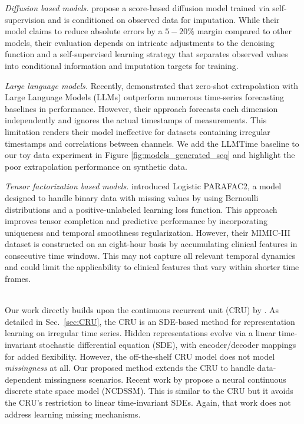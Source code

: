 \emph{Diffusion based models.}
\citet{tashiro2021csdi} propose a score-based diffusion model trained via self-supervision and is conditioned on observed data for imputation. While their model claims to reduce absolute errors by a $5-20\%$ margin compared to other models, their evaluation depends on intricate adjustments to the denoising function and a self-supervised learning strategy that separates observed values into conditional information and imputation targets for training.

\emph{Large language models.} Recently, \citet{gruver2023large} demonstrated that zero-shot extrapolation with Large Language Models (LLMs) outperform numerous time-series forecasting baselines in performance. However, their approach forecasts each dimension independently and ignores the actual timestamps of measurements. This limitation renders their model ineffective for datasets containing irregular timestamps and correlations between channels. We add the LLMTime baseline to our toy data experiment in Figure \ref{fig:models_generated_seq} and highlight the poor extrapolation performance on synthetic data.

\emph{Tensor factorization based models.} \citep{yin2020logpar} introduced Logistic PARAFAC2, a model designed to handle binary data with missing values by using Bernoulli distributions and a positive-unlabeled learning loss function. This approach improves tensor completion and predictive performance by incorporating uniqueness and temporal smoothness regularization. However, their MIMIC-III dataset is constructed on an eight-hour basis by accumulating clinical features in consecutive time windows. This may not capture all relevant temporal dynamics and could limit the applicability to clinical features that vary within shorter time frames.

~\\ \noindent
Our work directly builds upon the continuous recurrent unit (CRU) by \citet{schirmer2022modeling}. 
As detailed in Sec.~\ref{sec:CRU}, the CRU is an SDE-based method for representation learning on irregular time series.
Hidden representations evolve via a linear time-invariant stochastic differential equation (SDE), with encoder/decoder mappings for added flexibility. 
However, the off-the-shelf CRU model does not model \emph{missingness} at all. Our proposed method extends the CRU to handle data-dependent missingness scenarios.
Recent work by \citet{ansari2023neural} propose a neural continuous discrete state space model (NCDSSM). This is similar to the CRU but it avoids the CRU's restriction to linear time-invariant SDEs. Again, that work does not address learning  missing mechanisms.